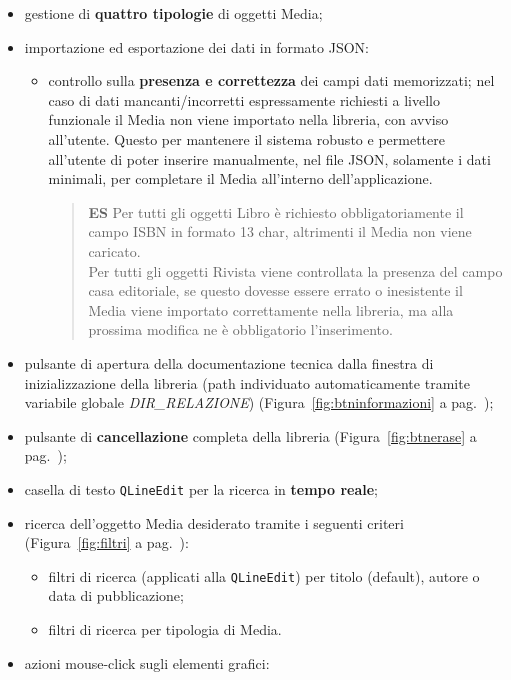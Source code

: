 \documentclass[a4paper,10pt]{article}
\begin{document}
	\begin{itemize}
		\item gestione di \textbf{quattro tipologie} di oggetti Media;
		\item importazione ed esportazione dei dati in formato JSON:
		\begin{itemize}
			\item controllo sulla \textbf{presenza e correttezza} dei campi dati memorizzati; nel caso di dati mancanti/incorretti espressamente richiesti a livello funzionale il Media non viene importato nella libreria, con avviso all'utente. Questo per mantenere il sistema robusto e permettere all'utente di poter inserire manualmente, nel file JSON, solamente i dati minimali, per completare il Media all'interno dell'applicazione.
			\begin{quote}
				\textbf{ES} Per tutti gli oggetti Libro è richiesto obbligatoriamente il campo ISBN in formato 13 char, altrimenti il Media non viene caricato.\\
				Per tutti gli oggetti Rivista viene controllata la presenza del campo casa editoriale, se questo dovesse essere errato o inesistente il Media viene importato correttamente nella libreria, ma alla prossima modifica ne è obbligatorio l'inserimento.
			\end{quote}
		\end{itemize}
		\item pulsante di apertura della documentazione tecnica dalla finestra di inizializzazione della libreria (path individuato automaticamente tramite variabile globale \textit{DIR\_RELAZIONE}) (Figura~\ref{fig:btninformazioni} a pag.~\pageref{fig:btninformazioni});
		\item pulsante di \textbf{cancellazione} completa della libreria (Figura~\ref{fig:btnerase} a pag.~\pageref{fig:btnerase});
		\item casella di testo \texttt{\texttt{QLineEdit}} per la ricerca in \textbf{tempo reale};
		\item ricerca dell'oggetto Media desiderato tramite i seguenti criteri (Figura~\ref{fig:filtri} a pag.~\pageref{fig:filtri}):
		\begin{itemize}
			\item filtri di ricerca (applicati alla \texttt{QLineEdit}) per titolo (default), autore o data di pubblicazione;
			\item filtri di ricerca per tipologia di Media.
		\end{itemize}
		\item azioni mouse-click sugli elementi grafici:

\end{itemize}
\end{document}
